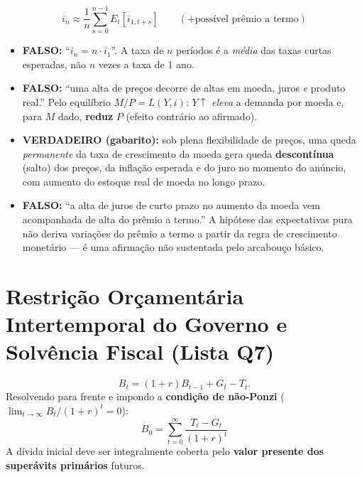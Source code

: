 \documentclass[12pt, a4paper]{article}
\begin{document}
\begin{formulabox}[title={Estrutura a termo (hipótese das expectativas)}]
\[
  \boxed{i_n \approx \frac{1}{n}\sum_{s=0}^{n-1} E_t[i_{1,t+s}]} \qquad(+ \text{possível prêmio a termo})
\]
\end{formulabox}

\begin{armbox}[title={Armadilhas (P2-2021 Q3)}]
\begin{itemize}[leftmargin=*]
  \item \textbf{FALSO:} ``$i_n = n\cdot i_1$''. A taxa de $n$ períodos é a
    \emph{média} das taxas curtas esperadas, não $n$ vezes a taxa de 1 ano.
  \item \textbf{FALSO:} ``uma alta de preços decorre de altas em moeda,
    juros \emph{e} produto real.'' Pelo equilíbrio $M/P=L(Y,i)$: $Y\uparrow$
    \emph{eleva} a demanda por moeda e, para $M$ dado, \textbf{reduz} $P$
    (efeito contrário ao afirmado).
  \item \textbf{VERDADEIRO (gabarito):} sob plena flexibilidade de preços,
    uma queda \emph{permanente} da taxa de crescimento da moeda gera queda
    \textbf{descontínua} (salto) dos preços, da inflação esperada e do juro
    no momento do anúncio, com aumento do estoque real de moeda no longo
    prazo.
  \item \textbf{FALSO:} ``a alta de juros de curto prazo no aumento da
    moeda vem acompanhada de alta do prêmio a termo.'' A hipótese das
    expectativas pura não deriva variações do prêmio a termo a partir da
    regra de crescimento monetário --- é uma afirmação não sustentada pelo
    arcabouço básico.
\end{itemize}
\end{armbox}

\section{Restrição Orçamentária Intertemporal do Governo e Solvência Fiscal (Lista Q7)}

\begin{formulabox}[title={A restrição em tempo discreto e sua forma resolvida}]
\[
  B_t = (1+r)B_{t-1} + G_t - T_t.
\]
Resolvendo para frente e impondo a \textbf{condição de não-Ponzi}
($\lim_{t\to\infty} B_t/(1+r)^t = 0$):
\[
  \boxed{B_0 = \sum_{t=0}^{\infty} \frac{T_t - G_t}{(1+r)^t}}
\]
A dívida inicial deve ser integralmente coberta pelo \textbf{valor presente
dos superávits primários} futuros.
\end{formulabox}
\end{document}
